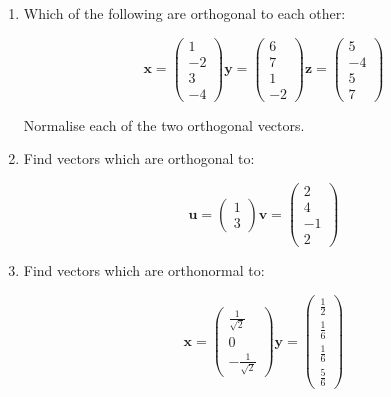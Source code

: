 \begin{enumerate}
\item Which of the following are orthogonal to each other:

\begin{displaymath}
\boldsymbol{x} = \left( \begin{array}{r} 1 \\ -2 \\ 3 \\ -4 \end{array} \right)
\boldsymbol{y} = \left( \begin{array}{r} 6 \\ 7 \\ 1 \\ -2 \end{array} \right)
\boldsymbol{z} = \left( \begin{array}{r} 5 \\ -4 \\ 5 \\ 7 \end{array} \right)
\end{displaymath}

Normalise each of the two orthogonal vectors.


\item Find vectors which are orthogonal to:


\begin{displaymath}
\boldsymbol{u} =  \left( \begin{array}{r} 1 \\ 3 \end{array} \right)
\boldsymbol{v} = \left( \begin{array}{r} 2 \\ 4 \\ -1 \\ 2 \end{array} \right)
\end{displaymath}

\item Find vectors which are orthonormal to:


\begin{displaymath}
\boldsymbol{x} =  \left( \begin{array}{r} \frac{1}{\sqrt{2}} \\ 0 \\ -\frac{1}{\sqrt{2}} \end{array} \right)
\boldsymbol{y} = \left( \begin{array}{r} \frac{1}{2} \\ \frac{1}{6} \\ \frac{1}{6} \\ \frac{5}{6} \end{array} \right)
\end{displaymath}



\end{enumerate}

